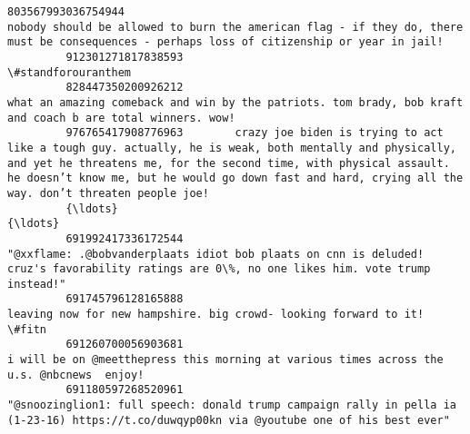 \documentclass[11pt]{article}
\begin{document}
\begin{Verbatim}[commandchars=\\\{\}]
         803567993036754944                                                                                                                                                nobody should be allowed to burn the american flag - if they do, there must be consequences - perhaps loss of citizenship or year in jail!   
         912301271817838593                                                                                                                                                                                                                                                                        \#standforouranthem   
         828447350200926212                                                                                                                                                                                what an amazing comeback and win by the patriots. tom brady, bob kraft and coach b are total winners. wow!   
         976765417908776963        crazy joe biden is trying to act like a tough guy. actually, he is weak, both mentally and physically, and yet he threatens me, for the second time, with physical assault. he doesn’t know me, but he would go down fast and hard, crying all the way. don’t threaten people joe!   
         {\ldots}                                                                                                                                                                                                                                                                                                      {\ldots}   
         691992417336172544                                                                                                                                               "@xxflame: .@bobvanderplaats idiot bob plaats on cnn is deluded! cruz's favorability ratings are 0\%, no one likes him. vote trump instead!"   
         691745796128165888                                                                                                                                                                                                                    leaving now for new hampshire. big crowd- looking forward to it! \#fitn   
         691260700056903681                                                                                                                                                                                                 i will be on @meetthepress this morning at various times across the u.s. @nbcnews  enjoy!   
         691180597268520961                                                                                                                                                "@snoozinglion1: full speech: donald trump campaign rally in pella ia (1-23-16) https://t.co/duwqyp00kn via @youtube one of his best ever"   

\end{Verbatim}
\end{document}
